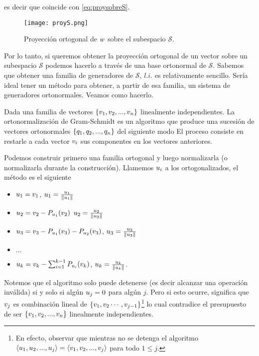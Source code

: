 es decir que coincide con \eqref{eq:proysobreS}.
\begin{figure}
\texttt{[image: proyS.png]}
 \label{fig:proyecsobreS}
 \caption{Proyección ortogonal de $\wb$ sobre el subespacio $\mathcal{S}$.}
\end{figure}

Por lo tanto, si queremos obtener la proyección ortogonal de un vector sobre un subespacio $\mathcal{S}$ podemos hacerlo a través de una base ortonormal de $\mathcal{S}$. Sabemos que obtener una familia de generadores de $\mathcal{S}$, $l.i.$ es relativamente sencillo. Sería ideal tener un método para obtener, a partir de esa familia, un sistema de generadores ortonormales. Veamos como hacerlo.

Dada una familia de vectores $\{\vb_1, \vb_2, ...,\vb_n\}$ linealmente independientes. La ortonormalización de Gram-Schmidt
es un algoritmo que produce una sucesión de vectores ortonormales  $\{\qb_1,\qb_2,...,\qb_n\}$ del siguiente modo
El proceso consiste en restarle a cada vector $\vb_i$ sus componentes en los vectores anteriores.

Podemos construir primero una familia ortogonal y luego normalizarla (o normalizarla durante la construcción). Llamemos $\ub_i$ a los ortogonalizados, el método es el siguiente
\begin{itemize}
\item   $\ub_1 = \vb_1$, $\ub_1 = \frac{\ub_1}{\|\ub_1\|}$
\item   $\ub_2 = \vb_2 -\Pb_{\ub_1}(\vb_2)$
$\ub_2 = \frac{\ub_2}{\|\ub_2\|}$
\item   $\ub_3 = \vb_3 -
\Pb_{\ub_1}(\vb_3)-\Pb_{\ub_2}(\vb_3)$, $\ub_3 = \frac{\ub_3}{\|\ub_3\|}$
\item   $\dots$
\item $\ub_k = \vb_k - \sum_{i = 1}^{k-1} \Pb_{\ub_i}(\vb_k)$, $\ub_k = \frac{\ub_k}{\|\ub_k\|}$.
\end{itemize}
Notemos que el algoritmo solo puede detenerse (es decir alcanzar una operación inválida) si y solo si algún $u_j=\cero$ para algún $j$. Pero si esto ocurre, significa que $\vb_j$ es combinación lineal de $\{\vb_1,\vb_2\cdots,\vb_{j-1}\}$\footnote{En efecto, observar que mientras no se detenga el algoritmo $\langle\ub_1,\ub_2,...,\ub_{j}\rangle=\langle\vb_1,\vb_2,..., \vb_{j}\rangle$ para todo $1\le j$.} lo cual contradice el presupuesto de ser $\{\vb_1, \vb_2, ...,\vb_n\}$ linealmente independientes.

